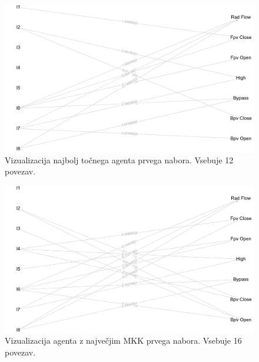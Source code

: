 \begin{figure}[H]
    \begin{center}
        \includegraphics[width=13cm]{shuttle/1/acc_g}
    \end{center}
    \caption{Vizualizacija najbolj točnega agenta prvega nabora. Vsebuje 12 povezav.}
    \label{fig:statlog_acc_1_g}
\end{figure}

\begin{figure}[H]
    \begin{center}
        \includegraphics[width=13cm]{shuttle/1/mcc_g}
    \end{center}
    \caption{Vizualizacija agenta z največjim MKK prvega nabora. Vsebuje 16 povezav.}
    \label{fig:statlog_mcc_1_g}
\end{figure}


